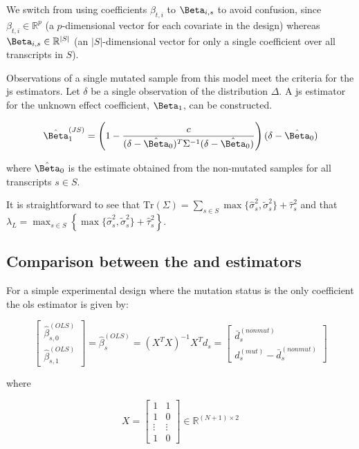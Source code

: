 We switch from using coefficients $\beta_{t,i}$ to $\Beta_{i,s}$ to avoid confusion, since $\beta_{t,i} \in \mathbb{R}^p$ (a $p$-dimensional vector for each covariate in the design) whereas $\Beta_{i,s} \in \mathbb{R}^{|S|}$ (an $|S|$-dimensional vector for only a single coefficient over all transcripts in $S$).

Observations of a single mutated sample from this model meet the criteria for the \gls{js} estimators.
Let $\delta$ be a single observation of the distribution $\Delta$.
A \gls{js} estimator for the unknown effect coefficient, $\Beta_1$, can be constructed.

\begin{equation}
  \hat{\Beta}_1^{(JS)} = \left( 1 - \frac{c}{(\delta - \hat{\Beta}_0)^T \Sigma^{-1} (\delta - \hat{\Beta}_0)} \right)(\delta - \hat{\Beta}_0)
  \label{eqn:js_defn}
\end{equation}

where $\hat{\Beta}_0$ is the estimate obtained from the non-mutated samples for all transcripts $s \in S$.

It is straightforward to see that $\text{Tr}(\Sigma) = \sum_{s \in S} \max\{ \hat{\sigma}_s^2, \tilde{\sigma}_s^2 \} + \hat{\tau}_s^2$ and that $\lambda_L = \max_{s \in S} \left\{ \max\{ \hat{\sigma}_s^2, \tilde{\sigma}_s^2 \} + \hat{\tau}_s^2 \right\}$.

\subsection{Comparison between the  and  estimators}

For a simple experimental design where the mutation status is the only coefficient the \gls{ols} estimator is given by:

\begin{equation*}
  \begin{bmatrix}
    \hat{\beta}_{s,0}^{(OLS)} \\
    \hat{\beta}_{s,1}^{(OLS)}
  \end{bmatrix}
  = \hat{\beta}_s^{(OLS)}
  = (X^TX)^{-1}X^T d_s
  = \begin{bmatrix}
    \bar{d}_s^{(nonmut)} \\
    d_s^{(mut)} - \bar{d}_s^{(nonmut)}
  \end{bmatrix}
\end{equation*}

where

\begin{equation*}
  X = \begin{bmatrix}
    1 & 1 \\
    1 & 0 \\
    \vdots & \vdots \\
    1 & 0
  \end{bmatrix}
  \in \mathbb{R}^{(N + 1) \times 2}
\end{equation*}

